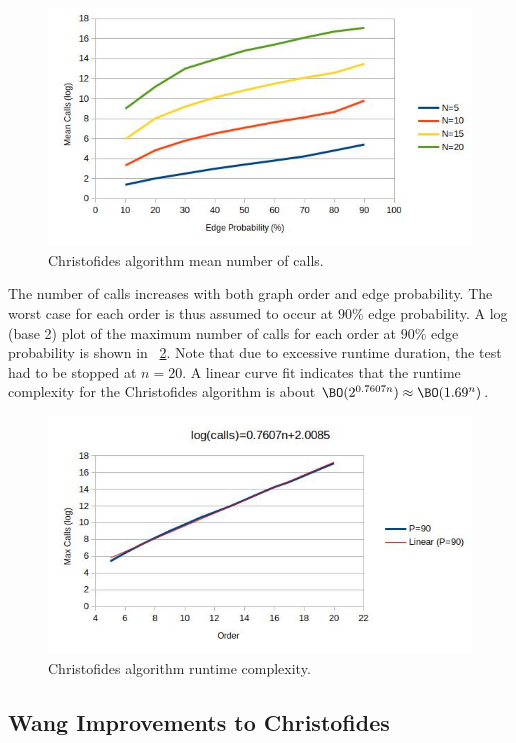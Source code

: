 \begin{figure}[H]
  \centering
  \includegraphics[width=5in]{christofides_calls}
  \caption{Christofides algorithm mean number of calls.}
  \label{fig:cfcalls}
\end{figure}

The number of calls increases with both graph order and edge probability.  The worst case for each order is thus
assumed to occur at \(90\%\) edge probability.  A log (base 2) plot of the maximum number of calls for each order
at \(90\%\) edge probability is shown in \figurename~\ref{fig:cfruntime}.  Note that due to excessive runtime
duration, the test had to be stopped at \(n=20\).  A linear curve fit indicates that the runtime complexity for the
Christofides algorithm is about \(\BO(2^{0.7607n})\approx\BO(1.69^n)\).

\begin{figure}[H]
  \centering
  \includegraphics[width=5in]{christofides_runtime}
  \caption{Christofides algorithm runtime complexity.}
  \label{fig:cfruntime}
\end{figure}

\subsection{Wang Improvements to Christofides}\label{sec:sub:wang}

